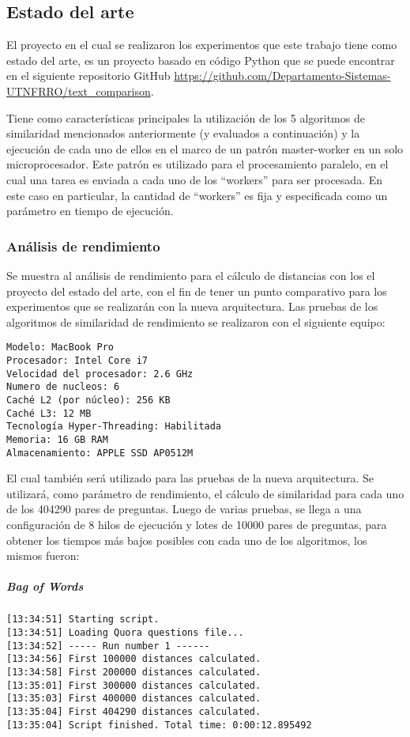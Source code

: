 \subsection{Estado del arte}
El proyecto en el cual se realizaron los experimentos que este trabajo tiene como estado del arte, es un proyecto basado en código Python que se puede encontrar en el siguiente repositorio GitHub \url{https://github.com/Departamento-Sistemas-UTNFRRO/text_comparison}.

\bigskip Tiene como características principales la utilización de los 5 algoritmos de similaridad mencionados anteriormente (y evaluados a continuación) y la ejecución de cada uno de ellos en el marco de un patrón master-worker en un solo microprocesador. Este patrón es utilizado para el procesamiento paralelo, en el cual una tarea es enviada a cada uno de los “workers” para ser procesada. En este caso en particular, la cantidad de “workers” es fija y especificada como un parámetro en tiempo de ejecución.

\subsubsection{Análisis de rendimiento}
Se muestra al análisis de rendimiento para el cálculo de distancias con los el proyecto del estado del arte, con el fin de tener un punto comparativo para los experimentos que se realizarán con la nueva arquitectura. Las pruebas de los algoritmos de similaridad de rendimiento se realizaron con el siguiente equipo:

\begin{verbatim}
Modelo: MacBook Pro
Procesador: Intel Core i7
Velocidad del procesador: 2.6 GHz
Numero de nucleos: 6
Caché L2 (por núcleo): 256 KB
Caché L3: 12 MB
Tecnología Hyper-Threading: Habilitada
Memoria: 16 GB RAM
Almacenamiento: APPLE SSD AP0512M
\end{verbatim}

El cual también será utilizado para las pruebas de la nueva arquitectura. Se utilizará, como parámetro de rendimiento, el cálculo de similaridad para cada uno de los 404290 pares de preguntas. Luego de varias pruebas, se llega a una configuración de 8 hilos de ejecución y lotes de 10000 pares de preguntas, para obtener los tiempos más bajos posibles con cada uno de los algoritmos, los mismos fueron:

\subparagraph{Bag of Words}
\begin{verbatim}
[13:34:51] Starting script.
[13:34:51] Loading Quora questions file...
[13:34:52] ----- Run number 1 ------
[13:34:56] First 100000 distances calculated.
[13:34:58] First 200000 distances calculated.
[13:35:01] First 300000 distances calculated.
[13:35:03] First 400000 distances calculated.
[13:35:04] First 404290 distances calculated.
[13:35:04] Script finished. Total time: 0:00:12.895492
\end{verbatim}

